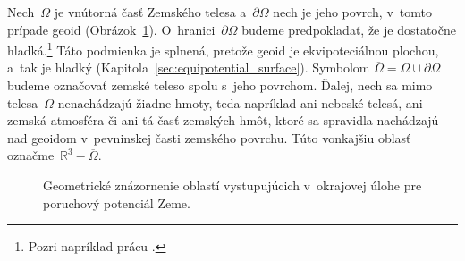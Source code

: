 \documentclass[a4paper,12pt]{book}
\begin{document}
Nech~$\Omega$ je vnútorná časť Zemského telesa a~$\partial \Omega$ nech je jeho 
povrch, v~tomto prípade geoid (Obrázok~\ref{fig:boundary_value_problems}).  
O~hranici~$\partial \Omega$ budeme predpokladať, že je dostatočne 
hladká.\footnote{Pozri napríklad prácu \textcite{SansoGeoidDetermination}.}  
Táto podmienka je splnená, pretože geoid je ekvipoteciálnou plochou, a~tak je 
hladký (Kapitola~\ref{sec:equipotential_surface}).  Symbolom $\overline{\Omega} 
= \Omega \cup \partial\Omega$ budeme označovať zemské teleso spolu s~jeho 
povrchom.  Ďalej, nech sa mimo telesa~$\overline{\Omega}$ nenachádzajú žiadne 
hmoty, teda napríklad ani nebeské telesá, ani zemská atmosféra či ani tá časť 
zemských hmôt, ktoré sa spravidla nachádzajú nad geoidom v~pevninskej časti 
zemského povrchu.  Túto vonkajšiu oblasť označme~$\mathbb{R}^3 
- \overline{\Omega}$.

\begin{figure}[bt]
\centering

\caption{Geometrické znázornenie oblastí vystupujúcich v~okrajovej úlohe pre 
poruchový potenciál Zeme.}
\label{fig:boundary_value_problems}
\end{figure}
\end{document}

